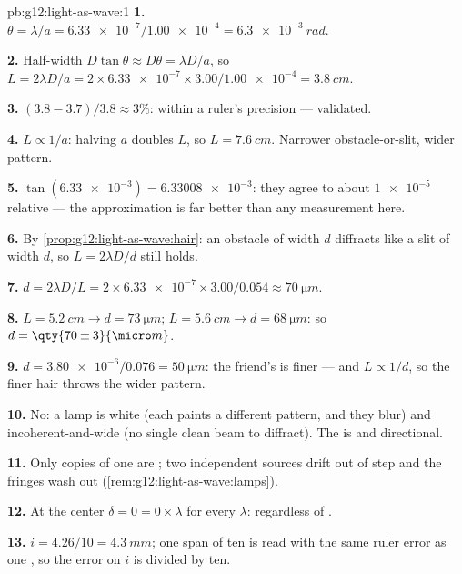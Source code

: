 \begin{solution}{pb:g12:light-as-wave:1}
\textbf{1.} $\theta = \lambda/a = \num{6.33e-7}/\num{1.00e-4} =
\qty{6.3e-3}{rad}$.

\textbf{2.} Half-width $D\tan\theta \approx D\theta = \lambda D/a$,
so $L = 2\lambda D/a = 2 \times \num{6.33e-7} \times
3.00/\num{1.00e-4} = \qty{3.8}{cm}$.

\textbf{3.} $(3.8 - 3.7)/3.8 \approx 3\%$: within a ruler's
precision --- validated.

\textbf{4.} $L \propto 1/a$: halving $a$ doubles $L$, so
$L = \qty{7.6}{cm}$. Narrower obstacle-or-slit, wider pattern.

\textbf{5.} $\tan(\num{6.33e-3}) = \num{6.33008e-3}$: they agree to
about $\num{1e-5}$ relative --- the approximation is far better than
any measurement here.

\textbf{6.} By \cref{prop:g12:light-as-wave:hair}: an obstacle of width
$d$ diffracts like a slit of width $d$, so $L = 2\lambda D/d$ still
holds.

\textbf{7.} $d = 2\lambda D/L = 2 \times \num{6.33e-7} \times
3.00/0.054 \approx \qty{70}{\micro m}$.

\textbf{8.} $L = \qty{5.2}{cm} \to d = \qty{73}{\micro m}$;
$L = \qty{5.6}{cm} \to d = \qty{68}{\micro m}$: so
$d = \qty{70 \pm 3}{\micro m}$.

\textbf{9.} $d = \num{3.80e-6}/0.076 = \qty{50}{\micro m}$: the
friend's is finer --- and $L \propto 1/d$, so the finer hair throws
the wider pattern.

\textbf{10.} No: a lamp is white (each  paints a different
pattern, and they blur) and incoherent-and-wide (no single clean beam
to diffract). The  is  and directional.

\textbf{11.} Only copies of one  are ; two independent
sources drift out of step and the fringes wash out
(\cref{rem:g12:light-as-wave:lamps}).

\textbf{12.} At the center $\delta = 0 = 0 \times \lambda$ for every
$\lambda$:  regardless of .

\textbf{13.} $i = 4.26/10 = \qty{4.3}{mm}$; one span of ten is read
with the same ruler error as one , so the error on $i$ is
divided by ten.


\end{solution}
